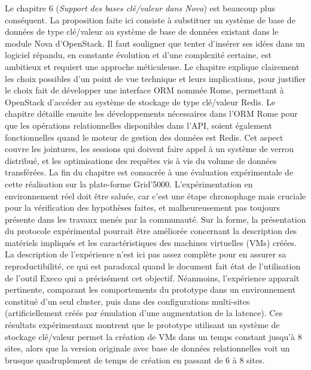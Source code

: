 \documentclass[a4paper,12pt]{article}
\begin{document}
Le chapitre 6 (\emph{Support des bases  clé/valeur dans Nova}) est beaucoup plus
conséquent. La proposition faite ici consiste à substituer un système de base de
données de type clé/valeur au système de base de données existant dans le module
Nova  d'OpenStack. Il  faut souligner  que tenter  d'insérer ses  idées dans  un
logiciel  répandu, en  constante  évolution et  d'une  complexité certaine,  est
ambitieux et requiert une approche méticuleuse.  Le chapitre explique clairement
les choix  possibles d'un  point de  vue technique  et leurs  implications, pour
justifier le choix fait de développer  une interface ORM nommée Rome, permettant
à  OpenStack d'accéder  au système  de stockage  de type  clé/valeur Redis.   Le
chapitre détaille  ensuite les développements  nécessaires dans l'ORM  Rome pour
que  les  opérations relationnelles  disponibles  dans  l'API, soient  également
fonctionnelles quand  le moteur de  gestion des  données est Redis.   Cet aspect
couvre  les jointures,  les sessions  qui doivent  faire appel  à un  système de
verrou  distribué, et  les optimisations  des requêtes  vis à  vis du  volume de
données  transférées.   La  fin  du  chapitre est  consacrée  à  une  évaluation
expérimentale      de     cette      réalisation     sur      la     plate-forme
Grid'5000. L'expérimentation en  environnement réel doit être  saluée, car c'est
une étape chronophage mais cruciale  pour la vérification des hypothèses faites,
et  malheureusement  pas  toujours  présente  dans  les  travaux  menés  par  la
communauté. Sur  la forme,  la présentation  du protocole  expérimental pourrait
être  améliorée  concernant  la  description  des  matériels  impliqués  et  les
caractéristiques  des  machines  virtuelles  (VMs) créées.   La  description  de
l'expérience n'est ici  pas assez complète pour en  assurer sa reproductibilité,
ce qui  est paradoxal quand  le document fait  état de l'utilisation  de l'outil
Execo  qui  a  précisément   cet  objectif.   Néanmoins,  l'expérience  apparaît
pertinente,  comparant  les comportements  du  prototype  dans un  environnement
constitué  d'un   seul  cluster,   puis  dans  des   configurations  multi-sites
(artificiellement créés  par émulation  d'une augmentation  de la  latence). Ces
résultats  expérimentaux  montrent que  le  prototype  utilisant un  système  de
stockage clé/valeur permet  la création de VMs dans un  temps constant jusqu'à 8
sites, alors que  la version originale avec base de  données relationnelles voit
un brusque quadruplement de temps de création en passant de 6 à 8 sites.
\end{document}
